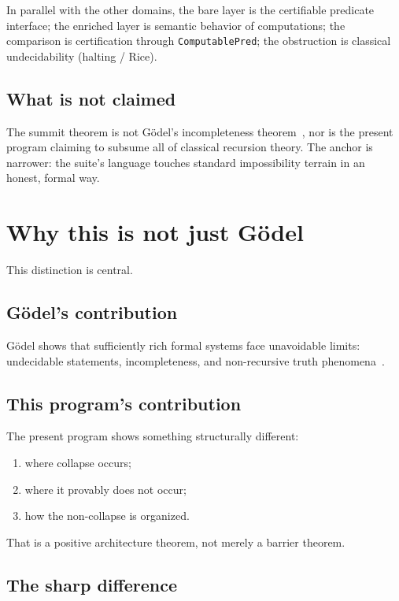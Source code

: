 \documentclass[11pt]{article}
\begin{document}
In parallel with the other domains, the bare layer is the certifiable predicate
interface; the enriched layer is semantic behavior of computations; the comparison is
certification through \texttt{ComputablePred}; the obstruction is classical
undecidability (halting / Rice).

\subsection{What is not claimed}

The summit theorem is not G\"odel's incompleteness theorem~\cite{Godel1931}, nor is
the present program claiming to subsume all of classical recursion theory. The
anchor is narrower: the suite's language touches standard impossibility terrain in
an honest, formal way.

\section{Why this is not just G\"odel}\label{sec:not-godel}

This distinction is central.

\subsection{G\"odel's contribution}

G\"odel shows that sufficiently rich formal systems face unavoidable limits:
undecidable statements, incompleteness, and non-recursive truth phenomena~\cite{Godel1931}.

\subsection{This program's contribution}

The present program shows something structurally different:
\begin{enumerate}[label=(\arabic*)]
  \item where collapse occurs;
  \item where it provably does not occur;
  \item how the non-collapse is organized.
\end{enumerate}

That is a positive architecture theorem, not merely a barrier theorem.

\subsection{The sharp difference}
\end{document}
